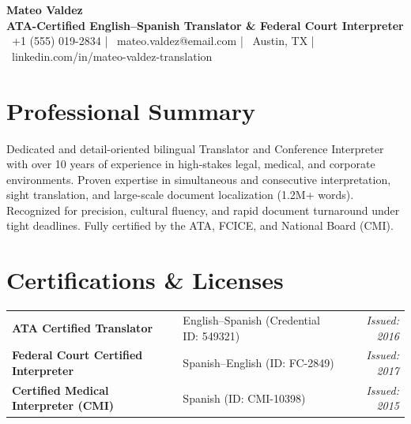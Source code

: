 \documentclass[10pt,letterpaper]{article}
\begin{document}
\begin{center}
  {\Huge\bfseries\color{primaryColor} Mateo Valdez} \\
  \vspace{4pt}
  {\large\bfseries\color{accentColor} ATA-Certified English--Spanish Translator \& Federal Court Interpreter} \\
  \vspace{6pt}
  \small
  \faPhone\ +1 (555) 019-2834 \quad | \quad
  \faEnvelope\ mateo.valdez@email.com \quad | \quad
  \faMapMarker\ Austin, TX \quad | \quad
  \faLinkedin\ linkedin.com/in/mateo-valdez-translation
\end{center}

\vspace{8pt}

\section*{Professional Summary}
Dedicated and detail-oriented bilingual Translator and Conference Interpreter with over 10 years of experience in high-stakes legal, medical, and corporate environments. Proven expertise in simultaneous and consecutive interpretation, sight translation, and large-scale document localization (1.2M+ words). Recognized for precision, cultural fluency, and rapid document turnaround under tight deadlines. Fully certified by the ATA, FCICE, and National Board (CMI).

\section*{Certifications \& Licenses}
\begin{tabularx}{\textwidth}{@{} l X r @{}}
  \textbf{ATA Certified Translator} & English--Spanish (Credential ID: 549321) & \textit{Issued: 2016} \\
  \textbf{Federal Court Certified Interpreter} & Spanish--English (ID: FC-2849) & \textit{Issued: 2017} \\
  \textbf{Certified Medical Interpreter (CMI)} & Spanish (ID: CMI-10398) & \textit{Issued: 2015} \\
\end{tabularx}

\end{document}
